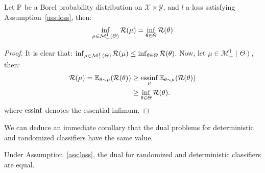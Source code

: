 \begin{prop}
Let $\mathbb{P}$ be a Borel probability distribution on $\mathcal{X}\times\mathcal{Y}$, and $l$ a loss satisfying Assumption~\ref{ass:loss}, then:
\begin{align*}
        \inf_{\mu\in\mathcal{M}^1_+(\Theta)} \mathcal{R}(\mu) =\inf_{\theta\in\Theta} \mathcal{R}(\theta)
\end{align*}
\end{prop}
\begin{proof}
It is clear that:         $\inf_{\mu\in\mathcal{M}^1_+(\Theta)} \mathcal{R}(\mu) \leq \inf_{\theta\in\Theta} \mathcal{R}(\theta)$. Now, let $\mu\in\mathcal{M}^1_+(\Theta)$, then:
\begin{align*}
    \risk(\mu)= \mathbb{E}_{\theta\sim\mu}(\risk(\theta))&\geq \essinf_\mu \mathbb{E}_{\theta\sim\mu} \left(\risk(\theta)\right)\\
    &\geq\inf_{\theta\in\Theta} \risk(\theta).
\end{align*}
where $\operatorname*{essinf}$ denotes the essential infimum.
\end{proof}
We can deduce an immediate corollary that the dual problems for deterministic and randomized classifiers have the same value.
\begin{corollary}
Under Assumption~\ref{ass:loss}, the dual for randomized and deterministic classifiers are equal.
\end{corollary}










